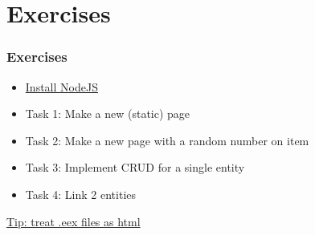\section{Exercises}

\frame{\tableofcontents[currentsection]}

\begin{frame}
    \frametitle{Exercises}
    \begin{itemize}
        \item \href{https://hexdocs.pm/phoenix/installation.html\#node-js}{Install NodeJS}
        \item Task 1: Make a new (static) page
        \item Task 2: Make a new page with a random number on item 
        \item Task 3: Implement CRUD for a single entity \footnotemark[1]
        \item Task 4: Link 2 entities \footnotemark[1]
    \end{itemize}

    \href{https://elixirforum.com/t/visual-studio-code-html-eex-support/12712/5}{Tip: treat .eex files as html}

\end{frame}

